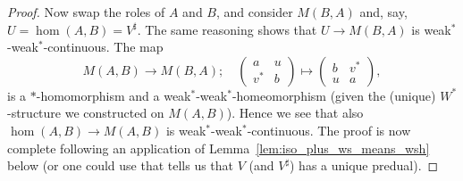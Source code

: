 \documentclass[a4paper,11pt]{article}
\theoremstyle{plain}
\theoremstyle{remark}
\newenvironment{remark}
  {\pushQED{\qed}\renewcommand{\qedsymbol}{$\triangle$}\remarkx}
  {\popQED\endremarkx}
\begin{document}
\begin{proof}
Now swap the roles of $A$ and $B$, and consider $M(B,A)$ and, say, $U = \hom(A,B) = V^\sharp$.  The same reasoning shows that $U \to M(B,A)$ is weak$^*$-weak$^*$-continuous.  The map
\[ M(A,B) \to M(B,A); \quad \begin{pmatrix} a & u \\ v^* & b \end{pmatrix}
\mapsto \begin{pmatrix} b & v^* \\ u & a \end{pmatrix}, \]
is a $*$-homomorphism and a weak$^*$-weak$^*$-homeomorphism (given the (unique) $W^*$-structure we constructed on $M(A,B)$).  Hence we see that also $\hom(A,B) \to M(A,B)$ is weak$^*$-weak$^*$-continuous.  The proof is now complete following an application of Lemma~\ref{lem:iso_plus_ws_means_wsh} below (or one could use that \cite[Theorem~2.6]{EOR_InjectivityNuclearityOS} tells us that $V$ (and $V^\sharp$) has a unique predual).
\end{proof}

\end{document}
